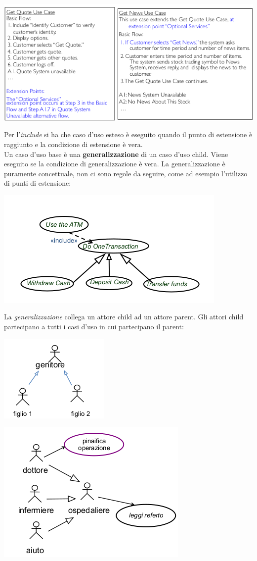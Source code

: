 \documentclass[a4paper,12pt, oneside]{book}
\begin{document}
\begin{center}
\includegraphics[scale=0.7]{img/ex2.png}
\end{center}
Per l'\textit{include} si ha che caso d'uso esteso è eseguito quando il punto di estensione è
raggiunto e la condizione di estensione è vera.\\
Un caso d'uso base è una \textbf{generalizzazione} di
un caso d'uso child. Viene eseguito se la condizione di
generalizzazione è vera. La generalizzazione è puramente concettuale, non ci sono regole da seguire, come ad
esempio l'utilizzo di punti di estensione:
\begin{center}
\includegraphics[scale=0.7]{img/gen.png}
\end{center}
La \textit{generalizzazione} collega un attore child ad un attore parent. Gli attori child partecipano a tutti i casi d'uso in cui partecipano il parent:
\begin{center}
\includegraphics[scale=0.7]{img/gen2.png}
\end{center}
\begin{center}
\includegraphics[scale=0.7]{img/gen3.png}
\end{center}
\end{document}
